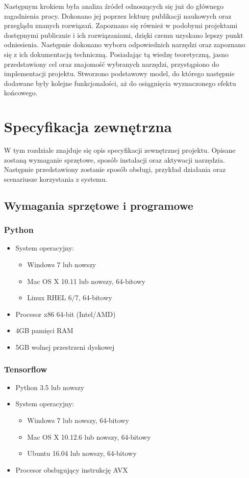 \documentclass[a4paper,twoside,12pt]{book}
\begin{document}
{{Następnym krokiem była analiza źródeł odnoszących się już do głównego zagadnienia pracy. Dokonano jej poprzez lekturę publikacji naukowych oraz przeglądu znanych rozwiązań. Zapoznano się również w podobymi projektami dostępnymi publicznie i ich rozwiązaniami, dzięki czemu uzyskano lepszy punkt odniesienia. Następnie dokonano wyboru odpowiednich narzędzi oraz zapoznano się z ich dokumentacją techniczną.}
{Posiadając tą wiedzę teoretyczną, jasno przedstawiony cel oraz znajomość wybranych narzędzi, przystąpiono do implementacji projektu. Stworzono podstawowy model, do którego następnie dodawane były kolejne funkcjonalości, aż do osiągnięcia wyznaczonego efektu końcowego.}







\chapter{Specyfikacja zewnętrzna}
{W tym rozdziale znajduje się opis specyfikacji zewnętrznej projektu. Opisane zostaną wymaganie sprzętowe, sposób instalacji oraz aktywacji narzędzia. Następnie przedstawiony zostanie sposób obsługi, przykład działania oraz scenariusze korzystania z systemu.}


\section{ Wymagania sprzętowe i programowe}
\subsection{Python }
\begin{itemize}
\item {System operacyjny:}
\begin{itemize}
\item {Windows 7 lub nowszy}
\item {Mac OS X 10.11 lub nowszy, 64-bitowy}
\item {Linux RHEL 6/7, 64-bitowy}
\end{itemize}
\item{Procesor x86 64-bit  (Intel/AMD)}
\item{4GB pamięci RAM}
\item{5GB wolnej przestrzeni dyskowej}
\end{itemize}

\subsection{Tensorflow}
\begin{itemize}
\item{Python 3.5 lub nowszy}
\item {System operacyjny:}
\begin{itemize}
\item {Windows 7 lub nowszy, 64-bitowy}
\item {Mac OS X 10.12.6 lub nowszy, 64-bitowy}
\item {Ubuntu 16.04 lub nowszy, 64-bitowy}
\end{itemize}
\item{Procesor obsługujący instrukcję AVX}


\end{itemize}}
\end{document}
